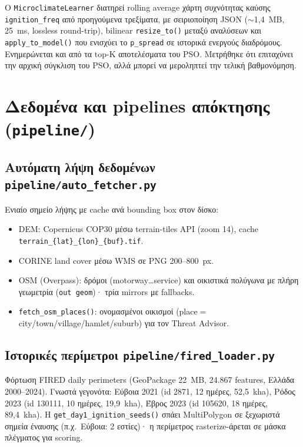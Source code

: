 \documentclass[11pt]{article}
\newcommand{\code}[1]{\texttt{#1}}
\begin{document}
Ο \code{MicroclimateLearner} διατηρεί rolling average χάρτη συχνότητας
καύσης \code{ignition\_freq} από προηγούμενα τρεξίματα, με σειριοποίηση
JSON ($\sim$1{,}4~MB, 25~ms, lossless round-trip), bilinear
\code{resize\_to()} μεταξύ αναλύσεων και \code{apply\_to\_model()} που
ενισχύει το \code{p\_spread} σε ιστορικά ενεργούς διαδρόμους. Ενημερώνεται
και από τα top-K αποτελέσματα του PSO. Μετρήθηκε ότι επιταχύνει την αρχική
σύγκλιση του PSO, αλλά μπορεί να μεροληπτεί την τελική βαθμονόμηση.

\section{Δεδομένα και pipelines απόκτησης (\code{pipeline/})}

\subsection{Αυτόματη λήψη δεδομένων \code{pipeline/auto\_fetcher.py}}
Ενιαίο σημείο λήψης με cache ανά bounding box στον δίσκο:
\begin{itemize}
  \item DEM: Copernicus COP30 μέσω terrain-tiles API (zoom 14), cache
        \code{terrain\_\{lat\}\_\{lon\}\_\{buf\}.tif}.
  \item CORINE land cover μέσω WMS σε PNG 200--800~px.
  \item OSM (Overpass): δρόμοι (motorway\ldots service) και οικιστικά
        πολύγωνα με πλήρη γεωμετρία (\code{out geom})· τρία mirrors με
        fallbacks.
  \item \code{fetch\_osm\_places()}: ονομασμένοι οικισμοί
        (place$=$city/town/village/hamlet/suburb) για τον Threat Advisor.
\end{itemize}

\subsection{Ιστορικές περίμετροι \code{pipeline/fired\_loader.py}}
Φόρτωση FIRED daily perimeters (GeoPackage 22~MB, 24.867 features, Ελλάδα
2000--2024). Γνωστά γεγονότα: Εύβοια 2021 (id 2871, 12 ημέρες, 52{,}5~kha),
Ρόδος 2023 (id 130111, 10 ημέρες, 19{,}9~kha), Έβρος 2023 (id 105620,
18 ημέρες, 89{,}4~kha). Η \code{get\_day1\_ignition\_seeds()} σπάει
MultiPolygon σε ξεχωριστά σημεία έναυσης (π.χ.\ Εύβοια: 2 εστίες)· η
περίμετρος rasterize-άρεται σε μάσκα πλέγματος για scoring.
\end{document}
